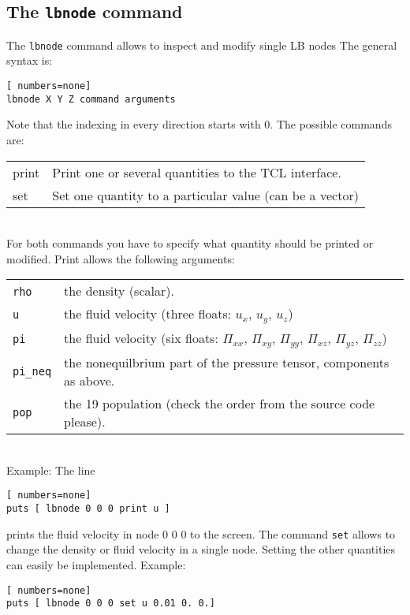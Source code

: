 \subsection*{The \lstinline|lbnode| command}
The \lstinline|lbnode| command allows to inspect and modify single LB nodes The
general syntax is:
\vspace{0,2cm}
\begin{lstlisting}[ numbers=none]
lbnode X Y Z command arguments
\end{lstlisting}
\vspace{0,2cm}
Note that the indexing in every direction starts with 0. The possible commands are:
\vspace{0,8cm}
\begin{tabular}{p{}p{}}
  print & Print one or several quantities to the TCL interface.\\
  set & Set one quantity to a particular value (can be a vector)\\
\end{tabular}\\
\vspace{0,8cm}
For both commands you have to specify what quantity should be printed
or modified. Print allows the following arguments: \\
\vspace{0,8cm}
\begin{tabular}{p{}p{}}
  \lstinline|rho|\ & the density (scalar). \\
  \lstinline|u| & the fluid velocity (three floats: $u_x$, $u_y$, $u_z$) \\
  \lstinline|pi| & the fluid velocity (six floats: $\Pi_{xx}$, $\Pi_{xy}$, $\Pi_{yy}$, $\Pi_{xz}$,  $\Pi_{yz}$,  $\Pi_{zz}$) \\
  \lstinline|pi_neq| & the nonequilbrium part of the pressure tensor, components as above. \\
  \lstinline|pop| & the 19 population (check the order from the source code please).
\end{tabular} \\
\vspace{0,8cm}
Example:
The line
\vspace{0,2cm}
\begin{lstlisting}[ numbers=none]
puts [ lbnode 0 0 0 print u ]
\end{lstlisting}
\vspace{0,2cm}
prints the fluid velocity in node 0 0 0 to the screen.
The command \lstinline|set| allows to change the density or fluid velocity in a single node. Setting
the other quantities can easily be implemented.
Example:
\begin{lstlisting}[ numbers=none]
puts [ lbnode 0 0 0 set u 0.01 0. 0.]
\end{lstlisting}
